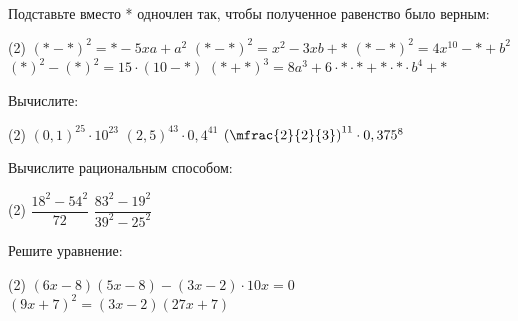 \begin{homework}[number=3]
	\begin{listofex}
		\item Подставьте вместо * одночлен так, чтобы полученное равенство было верным:
		\begin{tasks}(2)
			\task \( (*-*)^2=*-5xa+a^2 \)
			\task \( (*-*)^2=x^2-3xb+* \)
			\task \( (*-*)^2=4x^{10}-*+b^2 \)
			\task \( (*)^2-(*)^2= 15 \cdot (10-*) \)
			\task \( (*+*)^3=8a^3+6 \cdot * \cdot * + * \cdot * \cdot b^4 + * \)
		\end{tasks}
		\item Вычислите:
		\begin{tasks}(2)
			\task \( (0,1)^{25} \cdot 10^{23} \)
			\task \( (2,5)^{43} \cdot 0,4^{41} \)
			\task \( \left( \mfrac{2}{2}{3} \right)^{11}  \cdot 0,375^8 \)
		\end{tasks}
		\item Вычислите рациональным способом:
		\begin{tasks}(2)
			\task \( \dfrac{18^2-54^2}{72} \)
			\task \( \dfrac{83^2-19^2}{39^2-25^2} \)
		\end{tasks}
		\item Решите уравнение:
		\begin{tasks}(2)
			\task \( (6x-8)(5x-8)-(3x-2)\cdot 10x=0 \)
			\task \( (9x+7)^2= (3x-2)(27x+7) \)
		\end{tasks}
	\end{listofex}
\end{homework}

